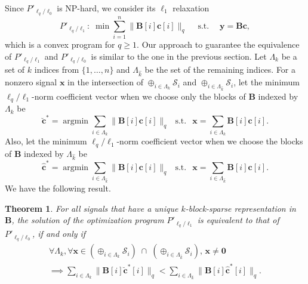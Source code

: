\documentclass[10pt,twocolumn,twoside] {IEEEtran}
\newtheorem{theorem}{Theorem}
\begin{document}
{Since $P'_{\ell_q/\ell_0}$ is NP-hard, we consider its $\ell_1$ relaxation
\begin{equation*}
\label{eq:optL2L1M}
P'_{\ell_q/\ell_1}: \; \min \sum_{i=1}^{n} \| {\boldsymbol{B}}[i] {\boldsymbol{c}}[i] \|_q \quad {\operatorname{s. t.}} \quad {\boldsymbol{y}} = {\boldsymbol{B}} {\boldsymbol{c}},
\end{equation*}
which is a convex program for $q \geq 1$. 
Our approach to guarantee the equivalence of $P'_{\ell_q/\ell_1}$ and $P'_{\ell_q/\ell_0}$ is similar to the one in the previous section. Let $\Lambda_k$ be a set of $k$ indices from $\{1, \ldots, n \}$ and $\Lambda_{\widehat{k}}$ be the set of the remaining indices. For a nonzero signal ${{\mathbf x}}$ in the intersection of $\oplus_{i \in \Lambda_k}{\mathcal{S}_i}$ and $\oplus_{i \in \Lambda_{\widehat{k}}}{\mathcal{S}_i}$, let the minimum $\ell_q/\ell_1$-norm coefficient vector when we choose only the blocks of ${\boldsymbol{B}}$ indexed by $\Lambda_k$ be
\begin{equation}
\label{eq:L2L1red3}
\breve{\boldsymbol{c}}^* = {\operatorname{argmin}} \sum_{i \in \Lambda_k} \! \| {\boldsymbol{B}}[i] {\boldsymbol{c}}[i] \|_q~~{\operatorname{s. t.}}~~{{\mathbf x}} = \sum_{i \in \Lambda_k} {\boldsymbol{B}}[i] {\boldsymbol{c}}[i].
\end{equation}
Also, let the minimum $\ell_q/\ell_1$-norm coefficient vector when we choose the blocks of ${\boldsymbol{B}}$ indexed by $\Lambda_{\widehat{k}}$ be
\begin{equation}
\label{eq:L2L1red4}
\widehat{\boldsymbol{c}}^{*} = {\operatorname{argmin}} \sum_{i \in \Lambda_{\widehat{k}}} \! \| {\boldsymbol{B}}[i] {\boldsymbol{c}}[i] \|_q~~{\operatorname{s. t.}}~~{{\mathbf x}} \!=\! \sum_{i \in \Lambda_{\widehat{k}}} {\boldsymbol{B}}[i] {\boldsymbol{c}}[i].
\end{equation}
We have the following result.
\vspace{1mm}
\begin{theorem}
\label{thm:SuffRedundant2}
For all signals that have a unique $k$-block-sparse representation in ${\boldsymbol{B}}$, the solution of the optimization program $P'_{\ell_q/\ell_1}$ is equivalent to that of $P'_{\ell_q/\ell_0}$, if and only if  
\begin{multline}
\label{eq:SuffRedundant1}
\forall \Lambda_k, \forall {{\mathbf x}}  \in (\oplus_{i \in \Lambda_k} \mathcal{S}_i) \; \cap \; (\oplus_{i \in \Lambda_{\widehat{k}}} \mathcal{S}_i), \, {{\mathbf x}} \neq {\boldsymbol{0}} \\ \implies \sum_{i \in \Lambda_k} \| {\boldsymbol{B}}[i] \breve{\boldsymbol{c}}^*[i] \|_q \!<\! \sum_{i \in \Lambda_{\widehat{k}}} \| {\boldsymbol{B}}[i] \widehat{\boldsymbol{c}}^*[i] \|_q.

\end{multline}
\end{theorem}}
\end{document}
